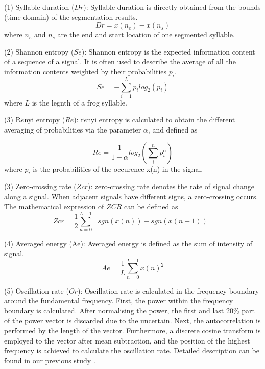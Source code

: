 \noindent(1) Syllable duration ($Dr$): Syllable duration \citep{Xie1504:Acoustic} is directly obtained from the bounds (time domain) of the segmentation results.
\begin{equation}
Dr = x(n_{e}) - x(n_{s})
\end{equation}
where $n_{e}$ and $n_{s}$ are the end and start location of one segmented syllable.

\vspace{3mm}

\noindent(2) Shannon entropy ($Se$): Shannon entropy is the expected information content of a sequence of a signal. It is often used to describe the average of all the information contents weighted by their probabilities $p_{i}$.
\begin{equation}
Se=-\sum_{i=1}^{L}p_{i}log_{2}(p_{i})
\end{equation}
where $L$ is the legnth of a frog syllable.

\vspace{3mm}

\noindent(3) R$\acute{e}$nyi entropy ($Re$): r$\acute{e}$nyi entropy is calculated to obtain the different averaging of probabilities via the parameter $\alpha$, and defined as

\begin{equation}
Re=\frac{1}{1-\alpha}log_{2}(\sum_{i}^{n}p_{i}^{\alpha})
\end{equation}
where $p_{i}$ is the probabilities of the occurence x(n) in the signal.

\vspace{3mm}

\noindent(3) Zero-crossing rate ($Zcr$): zero-crossing rate denotes the rate of signal change along a signal. When adjacent signals have different signs, a zero-crossing occurs. The mathematical expression of $ZCR$ can be defined as
\begin{equation}
Zcr=\frac{1}{2}\sum_{n=0}^{L-1}[sgn(x(n))-sgn(x(n+1))]
\end{equation}

\vspace{3mm}

\noindent(4) Averaged energy (Ae): Averaged energy is defined as the sum of intensity of signal.
\begin{equation}
Ae = \frac{1}{L}\sum_{n=0}^{L-1}x(n)^{2}
\end{equation}


\vspace{3mm}
\noindent(5) Oscillation rate ($Or$): Oscillation rate is calculated in the frequency boundary around the fundamental frequency. First, the power within the frequency boundary is calculated. After normalising the power, the first and last 20\% part of the power vector is discarded due to the uncertain. Next, the autocorrelation is performed by the length of the vector. Furthermore, a discrete cosine transform is employed to the vector after mean subtraction, and the position of the highest frequency is achieved to calculate the oscillation rate. Detailed description can be found in our previous study \citep{Xie1504:Acoustic}.




